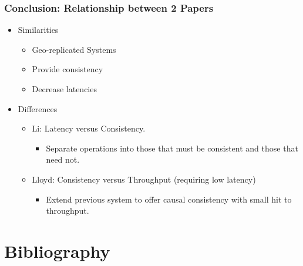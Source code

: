\documentclass{beamer}
\begin{document}
\begin{frame}
\frametitle{Conclusion: Relationship between 2 Papers}
\begin{itemize}
\pause \item Similarities
	\begin{itemize}
		\item Geo-replicated Systems
		\item Provide consistency
		\item Decrease latencies
	\end{itemize}
\pause \item Differences
	\begin{itemize}
		\item Li: Latency versus Consistency.
			\begin{itemize}
				\item Separate operations into those that must be consistent and those that need not.
			\end{itemize}
		\item Lloyd: Consistency versus Throughput (requiring low latency)
			\begin{itemize}
				\item Extend previous system to offer causal consistency with small hit to throughput.
			\end{itemize}
	\end{itemize}

\end{itemize}  
\end{frame}



\section{Bibliography} 
\end{document}
